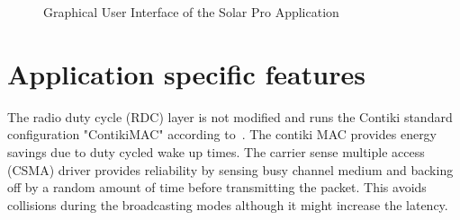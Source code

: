 \documentclass[conference]{IEEEtran}
\begin{document}
\begin{figure}[!ht]
\centering
{}
\hfil
{}
\caption{Graphical User Interface of the Solar Pro Application}
\label{GUIFig}
\end{figure}


\section{Application specific features}
The radio duty cycle (RDC) layer is not modified and runs the Contiki standard configuration "ContikiMAC" according to~\cite{dunkels2011contikimac}. The contiki MAC provides energy savings due to duty cycled wake up times. The carrier sense multiple access (CSMA) driver provides reliability by sensing busy channel medium and backing off by a random amount of time before transmitting the packet. This avoids collisions during the broadcasting modes although it might increase the latency.
\end{document}
